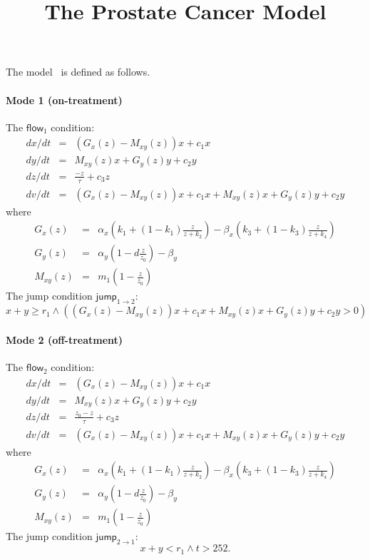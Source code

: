 \documentclass{article}
\title{The Prostate Cancer Model}
\author{}
\newcommand{\flow}{\mathsf{flow}}
\newcommand{\jump}{\mathsf{jump}}
\begin{document}
\maketitle

The model~\cite{source} is defined as follows. 

\paragraph{Mode 1 (on-treatment)}
The $\flow_1$ condition:
\begin{eqnarray*}
dx/dt &=& (G_x(z) - M_{xy}(z))x + c_1 x\\
dy/dt &=& M_{xy}(z)x+G_y(z)y+c_2y\\
dz/dt &=& \frac{-z}{\tau} + c_3z\\
dv/dt &=& (G_x(z) - M_{xy}(z))x + c_1 x + M_{xy}(z)x+G_y(z)y+c_2y
\end{eqnarray*}
where
\begin{eqnarray*}
G_x(z) &=& \alpha_x
(k_1+(1-k_1)\frac{z}{z+k_2})-\beta_x(k_3+(1-k_3)\frac{z}{z+k_4})\\
G_y(z) &=& \alpha_y (1- d\frac{z}{z_0}) - \beta_y\\
M_{xy}(z) &=& m_1(1-\frac{z}{z_0})
\end{eqnarray*}
The jump condition $\jump_{1 \rightarrow 2}:$
$$x + y \geq r_1 \wedge ((G_x(z) - M_{xy}(z))x + c_1 x +
M_{xy}(z)x+G_y(z)y+c_2y>0)$$

\paragraph{Mode 2 (off-treatment)}
The $\flow_2$ condition:
\begin{eqnarray*}
dx/dt &=& (G_x(z) - M_{xy}(z))x + c_1 x\\
dy/dt &=& M_{xy}(z)x+G_y(z)y+c_2y\\
dz/dt &=& \frac{z_0-z}{\tau} + c_3z\\
dv/dt &=& (G_x(z) - M_{xy}(z))x + c_1 x + M_{xy}(z)x+G_y(z)y+c_2y
\end{eqnarray*}
where
\begin{eqnarray*}
G_x(z) &=& \alpha_x
(k_1+(1-k_1)\frac{z}{z+k_2})-\beta_x(k_3+(1-k_3)\frac{z}{z+k_4})\\
G_y(z) &=& \alpha_y (1- d\frac{z}{z_0}) - \beta_y\\
M_{xy}(z) &=& m_1(1-\frac{z}{z_0})
\end{eqnarray*}
The jump condition $\jump_{2 \rightarrow 1}:$
$$x + y < r_1 \wedge t > 252.$$
\end{document}
